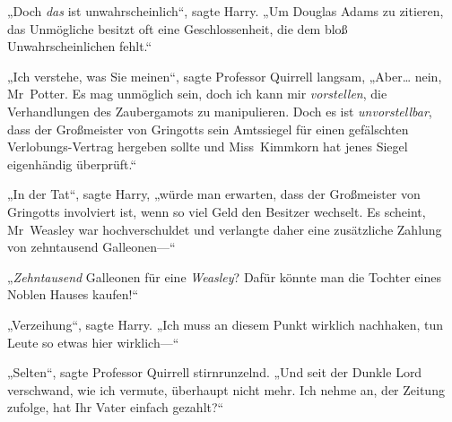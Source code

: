 „Doch \emph{das} ist unwahrscheinlich“, sagte Harry. „Um Douglas Adams zu zitieren, das Unmögliche besitzt oft eine Geschlossenheit, die dem bloß Unwahrscheinlichen fehlt.“

„Ich verstehe, was Sie meinen“, sagte Professor Quirrell langsam, „Aber… nein, Mr~Potter. Es mag unmöglich sein, doch ich kann mir \emph{vorstellen}, die Verhandlungen des Zaubergamots zu manipulieren. Doch es ist \emph{unvorstellbar}, dass der Großmeister von Gringotts sein Amtssiegel für einen gefälschten Verlobungs-Vertrag hergeben sollte und Miss~Kimmkorn hat jenes Siegel eigenhändig überprüft.“

„In der Tat“, sagte Harry, „würde man erwarten, dass der Großmeister von Gringotts involviert ist, wenn so viel Geld den Besitzer wechselt. Es scheint, Mr~Weasley war hochverschuldet und verlangte daher eine zusätzliche Zahlung von zehntausend Galleonen—“

„\emph{Zehntausend} Galleonen für eine \emph{Weasley}? Dafür könnte man die Tochter eines Noblen Hauses kaufen!“

„Verzeihung“, sagte Harry. „Ich muss an diesem Punkt wirklich nachhaken, tun Leute so etwas hier wirklich—“

„Selten“, sagte Professor Quirrell stirnrunzelnd. „Und seit der Dunkle Lord verschwand, wie ich vermute, überhaupt nicht mehr. Ich nehme an, der Zeitung zufolge, hat Ihr Vater einfach gezahlt?“

